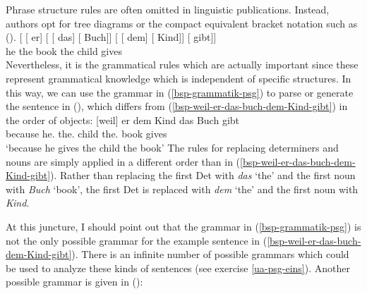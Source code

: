 Phrase structure rules are often omitted in linguistic publications. Instead, authors opt for tree diagrams or the compact equivalent bracket notation
such as ().
\ea
\gll {}[ [ er] [ [ das] [ Buch]]  [ [ dem] [ Kind]] [ gibt]]\\
     {}         {}        he  {}        {}       the  {}       book    {}        {}       the  {}       child     {}      gives\\  
\z
Nevertheless, it is the grammatical rules which are actually important since these represent grammatical knowledge which is independent of specific structures.
In this way, we can use the grammar in (\ref{bsp-grammatik-psg}) to parse or generate the sentence
in (), which differs from (\ref{bsp-weil-er-das-buch-dem-Kind-gibt}) in the order of objects: 
\ea
\gll {}[weil] er dem Kind das Buch gibt\\
	 {}\spacebr{}because he.\nom{} the.\dat{} child the.\acc{} book gives\\
\glt `because he gives the child the book'
\z
The rules for replacing determiners and nouns are simply applied in a different order than in (\ref{bsp-weil-er-das-buch-dem-Kind-gibt}). Rather than replacing the first Det with \emph{das} `the' and the first noun with \emph{Buch} `book', the first Det is replaced with \emph{dem} `the' and the first noun with \emph{Kind}.

At this juncture, I should point out that the grammar in (\ref{bsp-grammatik-psg}) is not the only possible grammar for the example sentence in
(\ref{bsp-weil-er-das-buch-dem-Kind-gibt}). There is an infinite\label{page-unendlich-viele-grammatiken} number of possible grammars which could
be used to analyze these kinds of sentences (see exercise \ref{ua-psg-eins}). Another possible grammar is given in ():

